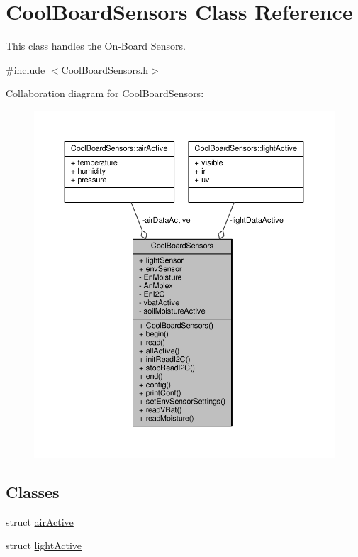 \hypertarget{classCoolBoardSensors}{}\section{Cool\+Board\+Sensors Class Reference}
\label{classCoolBoardSensors}


This class handles the On-\/\+Board Sensors.  




{\ttfamily \#include $<$Cool\+Board\+Sensors.\+h$>$}



Collaboration diagram for Cool\+Board\+Sensors\+:\nopagebreak
\begin{figure}[H]
\begin{center}
\leavevmode
\includegraphics[width=350pt]{classCoolBoardSensors__coll__graph}
\end{center}
\end{figure}
\subsection*{Classes}
\begin{DoxyCompactItemize}
\item 
struct \hyperlink{structCoolBoardSensors_1_1airActive}{air\+Active}
\item 
struct \hyperlink{structCoolBoardSensors_1_1lightActive}{light\+Active}
\end{DoxyCompactItemize}
